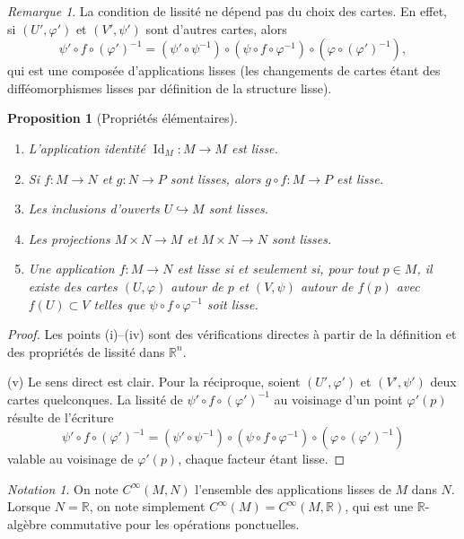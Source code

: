 \documentclass[12pt,a4paper,openany]{book}
\theoremstyle{definition}
\theoremstyle{plain}
\newtheorem{proposition}[definition]{Proposition}
\theoremstyle{remark}
\newtheorem{remarque}[definition]{Remarque}
\newtheorem{notation}[definition]{Notation}
\newcommand{\R}{\mathbb{R}}
\DeclareMathOperator{\Id}{Id}
\begin{document}
\begin{remarque}\label{rem:lisse-indep-cartes}
La condition de lissité ne dépend pas du choix des cartes. En effet, si
$(U', \varphi')$ et $(V', \psi')$ sont d'autres cartes, alors
\[
    \psi' \circ f \circ (\varphi')^{-1}
    = (\psi' \circ \psi^{-1}) \circ (\psi \circ f \circ \varphi^{-1})
    \circ (\varphi \circ (\varphi')^{-1}),
\]
qui est une composée d'applications lisses (les changements de cartes étant
des difféomorphismes lisses par définition de la structure lisse).
\end{remarque}

\begin{proposition}[Propriétés élémentaires]\label{prop:proprietes-lisses}
\begin{enumerate}[label=(\roman*)]
    \item L'application identité $\Id_M \colon M \to M$ est lisse.
    \item Si $f \colon M \to N$ et $g \colon N \to P$ sont lisses, alors
    $g \circ f \colon M \to P$ est lisse.
    \item Les inclusions d'ouverts $U \hookrightarrow M$ sont lisses.
    \item Les projections $M \times N \to M$ et $M \times N \to N$ sont lisses.
    \item Une application $f \colon M \to N$ est lisse si et seulement si, pour
    tout $p \in M$, il existe des cartes $(U, \varphi)$ autour de $p$ et
    $(V, \psi)$ autour de $f(p)$ avec $f(U) \subset V$ telles que
    $\psi \circ f \circ \varphi^{-1}$ soit lisse.
\end{enumerate}
\end{proposition}

\begin{proof}
Les points (i)--(iv) sont des vérifications directes à partir de la définition
et des propriétés de lissité dans $\R^n$.

(v) Le sens direct est clair. Pour la réciproque, soient $(U', \varphi')$ et
$(V', \psi')$ deux cartes quelconques. La lissité de $\psi' \circ f \circ
(\varphi')^{-1}$ au voisinage d'un point $\varphi'(p)$ résulte de l'écriture
\[
    \psi' \circ f \circ (\varphi')^{-1}
    = (\psi' \circ \psi^{-1}) \circ (\psi \circ f \circ \varphi^{-1})
    \circ (\varphi \circ (\varphi')^{-1})
\]
valable au voisinage de $\varphi'(p)$, chaque facteur étant lisse.
\end{proof}

\begin{notation}\label{not:Cinfty}
On note $C^\infty(M, N)$ l'ensemble des
applications lisses de $M$ dans $N$. Lorsque $N = \R$, on note simplement
$C^\infty(M) = C^\infty(M, \R)$, qui est une $\R$-algèbre commutative pour
les opérations ponctuelles.
\end{notation}
\end{document}
